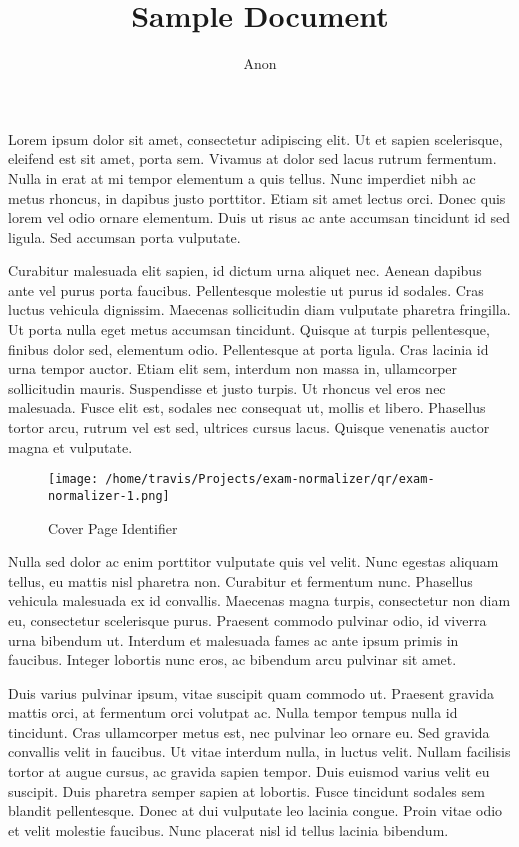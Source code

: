 \documentclass[12pt]{article}
\title{\textbf{Sample Document}}
\author{Anon}
\date{}
\begin{document}
\maketitle

Lorem ipsum dolor sit amet, consectetur adipiscing elit. Ut et sapien scelerisque, eleifend est sit amet, porta sem. Vivamus at dolor sed lacus rutrum fermentum. Nulla in erat at mi tempor elementum a quis tellus. Nunc imperdiet nibh ac metus rhoncus, in dapibus justo porttitor. Etiam sit amet lectus orci. Donec quis lorem vel odio ornare elementum. Duis ut risus ac ante accumsan tincidunt id sed ligula. Sed accumsan porta vulputate.

Curabitur malesuada elit sapien, id dictum urna aliquet nec. Aenean dapibus ante vel purus porta faucibus. Pellentesque molestie ut purus id sodales. Cras luctus vehicula dignissim. Maecenas sollicitudin diam vulputate pharetra fringilla. Ut porta nulla eget metus accumsan tincidunt. Quisque at turpis pellentesque, finibus dolor sed, elementum odio. Pellentesque at porta ligula. Cras lacinia id urna tempor auctor. Etiam elit sem, interdum non massa in, ullamcorper sollicitudin mauris. Suspendisse et justo turpis. Ut rhoncus vel eros nec malesuada. Fusce elit est, sodales nec consequat ut, mollis et libero. Phasellus tortor arcu, rutrum vel est sed, ultrices cursus lacus. Quisque venenatis auctor magna et vulputate.

\begin{figure}[htp]
\centering
\texttt{[image: /home/travis/Projects/exam-normalizer/qr/exam-normalizer-1.png]}
\caption{Cover Page Identifier}
\label{}
\end{figure}

Nulla sed dolor ac enim porttitor vulputate quis vel velit. Nunc egestas aliquam tellus, eu mattis nisl pharetra non. Curabitur et fermentum nunc. Phasellus vehicula malesuada ex id convallis. Maecenas magna turpis, consectetur non diam eu, consectetur scelerisque purus. Praesent commodo pulvinar odio, id viverra urna bibendum ut. Interdum et malesuada fames ac ante ipsum primis in faucibus. Integer lobortis nunc eros, ac bibendum arcu pulvinar sit amet.

Duis varius pulvinar ipsum, vitae suscipit quam commodo ut. Praesent gravida mattis orci, at fermentum orci volutpat ac. Nulla tempor tempus nulla id tincidunt. Cras ullamcorper metus est, nec pulvinar leo ornare eu. Sed gravida convallis velit in faucibus. Ut vitae interdum nulla, in luctus velit. Nullam facilisis tortor at augue cursus, ac gravida sapien tempor. Duis euismod varius velit eu suscipit. Duis pharetra semper sapien at lobortis. Fusce tincidunt sodales sem blandit pellentesque. Donec at dui vulputate leo lacinia congue. Proin vitae odio et velit molestie faucibus. Nunc placerat nisl id tellus lacinia bibendum.
\end{document}
